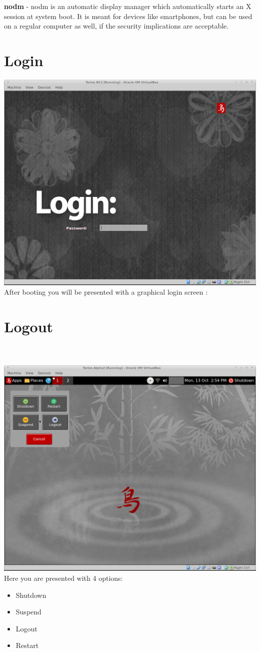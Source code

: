 \documentclass[12pt,a4paper]{book}
\begin{document}
\textbf{nodm} \cite{nodm} - nodm is an automatic display manager which automatically starts an X session at system boot. It is meant for devices like smartphones, but can be used on a regular computer as well, if the security implications are acceptable.


\chapter{Login}

\includegraphics[width=0.8\linewidth]{screen-shots/torios-rc2-login-screen} \\

After booting you will be presented with a graphical login screen :

\chapter{Logout}

\\
\\
\includegraphics[width=0.8\linewidth]{screen-shots/shutdown-menu} 
Here you are presented with 4 options:\\
\begin{itemize}
\item{Shutdown}
\item{Suspend}
\item{Logout}
\item{Restart}

\end{itemize}
\end{document}
